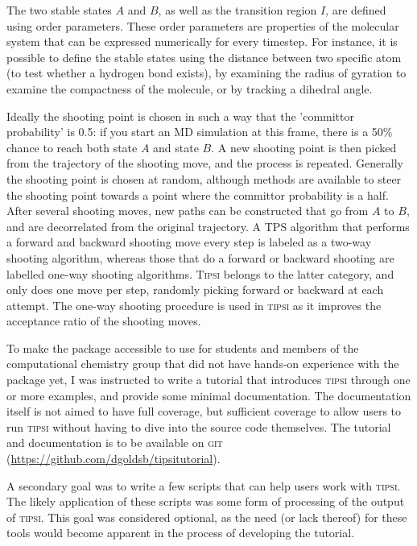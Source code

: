 \documentclass[]{article}
\begin{document}
The two stable states $A$ and $B$, as well as the transition region $I$, are defined using order parameters. These order parameters are properties of the molecular system that can be expressed numerically for every timestep. For instance, it is possible to define the stable states using the distance between two specific atom (to test whether a hydrogen bond exists), by examining the radius of gyration to examine the compactness of the molecule, or by tracking a dihedral angle. 

Ideally the shooting point is chosen in such a way that the 'committor probability' is 0.5: if you start an MD simulation at this frame, there is a 50\% chance to reach both state $A$ and state $B$. A new shooting point is then picked from the trajectory of the shooting move, and the process is repeated. Generally the shooting point is chosen at random, although methods are available to steer the shooting point towards a point where the committor probability is a half. After several shooting moves, new paths can be constructed that go from $A$ to $B$, and are decorrelated from the original trajectory. A TPS algorithm that performs a forward and backward shooting move every step is labeled as a two-way shooting algorithm, whereas those that do a forward or backward shooting are labelled one-way shooting algorithms. \textsc{Tipsi} belongs to the latter category, and only does one move per step, randomly picking forward or backward at each attempt. The one-way shooting procedure is used in \textsc{tipsi} as it improves the acceptance ratio of the shooting moves.

To make the package accessible to use for students and members of the computational chemistry group that did not have hands-on experience with the package yet, I was instructed to write a tutorial that introduces \textsc{tipsi} through  one or more examples, and provide some minimal documentation. The documentation itself is not aimed to have full coverage, but sufficient coverage to allow users to run \textsc{tipsi} without having to dive into the source code themselves. The tutorial and documentation is to be available on \textsc{git} (\url{https://github.com/dgoldsb/tipsitutorial}).

A secondary goal was to write a few scripts that can help users work with \textsc{tipsi}. The likely application of these scripts was some form of processing of the output of \textsc{tipsi}. This goal was considered optional, as the need (or lack thereof) for these tools would become apparent in the process of developing the tutorial.
\end{document}
